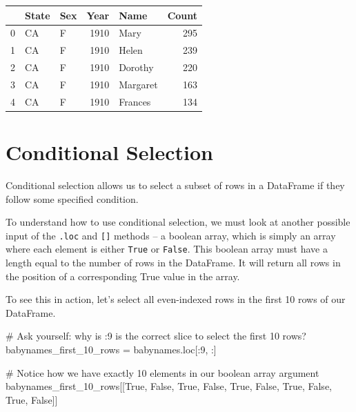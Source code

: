 \documentclass[
  letterpaper,
  DIV=11,
  numbers=noendperiod]{scrreprt}
\newenvironment{Shaded}{\begin{snugshade}}{\end{snugshade}}
\newcommand{\CommentTok}[1]{\textcolor[rgb]{0.37,0.37,0.37}{#1}}
\newcommand{\DecValTok}[1]{\textcolor[rgb]{0.68,0.00,0.00}{#1}}
\newcommand{\NormalTok}[1]{\textcolor[rgb]{0.00,0.23,0.31}{#1}}
\newcommand{\OperatorTok}[1]{\textcolor[rgb]{0.37,0.37,0.37}{#1}}
\newcommand{\VariableTok}[1]{\textcolor[rgb]{0.07,0.07,0.07}{#1}}
\begin{document}
\begin{tabular}{lllrlr}
\toprule
{} & State & Sex &  Year &      Name &  Count \\
\midrule
0 &    CA &   F &  1910 &      Mary &    295 \\
1 &    CA &   F &  1910 &     Helen &    239 \\
2 &    CA &   F &  1910 &   Dorothy &    220 \\
3 &    CA &   F &  1910 &  Margaret &    163 \\
4 &    CA &   F &  1910 &   Frances &    134 \\
\bottomrule
\end{tabular}

\hypertarget{conditional-selection}{%
\section{Conditional Selection}\label{conditional-selection}}

Conditional selection allows us to select a subset of rows in a
DataFrame if they follow some specified condition.

To understand how to use conditional selection, we must look at another
possible input of the \texttt{.loc} and \texttt{{[}{]}} methods -- a
boolean array, which is simply an array where each element is either
\texttt{True} or \texttt{False}. This boolean array must have a length
equal to the number of rows in the DataFrame. It will return all rows in
the position of a corresponding True value in the array.

To see this in action, let's select all even-indexed rows in the first
10 rows of our DataFrame.

\begin{Shaded}
\begin{Highlighting}[]
\CommentTok{\# Ask yourself: why is :9 is the correct slice to select the first 10 rows?}
\NormalTok{babynames\_first\_10\_rows }\OperatorTok{=}\NormalTok{ babynames.loc[:}\DecValTok{9}\NormalTok{, :]}

\CommentTok{\# Notice how we have exactly 10 elements in our boolean array argument}
\NormalTok{babynames\_first\_10\_rows[[}\VariableTok{True}\NormalTok{, }\VariableTok{False}\NormalTok{, }\VariableTok{True}\NormalTok{, }\VariableTok{False}\NormalTok{, }\VariableTok{True}\NormalTok{, }\VariableTok{False}\NormalTok{, }\VariableTok{True}\NormalTok{, }\VariableTok{False}\NormalTok{, }\VariableTok{True}\NormalTok{, }\VariableTok{False}\NormalTok{]]}
\end{Highlighting}
\end{Shaded}
\end{document}
